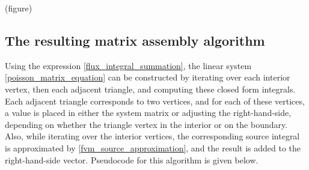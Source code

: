 \vskip 0.2in
(figure)
\vskip 0.2in

\subsection{The resulting matrix assembly algorithm}
Using the expression \eqref{flux_integral_summation}, the linear system
\eqref{poisson_matrix_equation} can be constructed by iterating over each interior vertex, then each adjacent triangle,
and computing these closed form integrals.
Each adjacent triangle corresponds to two vertices, and for each of these vertices,
a value is placed in either the system matrix or adjusting the right-hand-side,
depending on whether the triangle vertex in the interior or on the boundary. Also, while iterating over the interior vertices,
the corresponding source integral is approximated by \eqref{fvm_source_approximation}, and the result is added to the right-hand-side vector.
Pseudocode for this algorithm is given below.


\newcommand{\poissonfvmmatrixassembly}{Poisson\_FVM\_Matrix\_Assembly}

